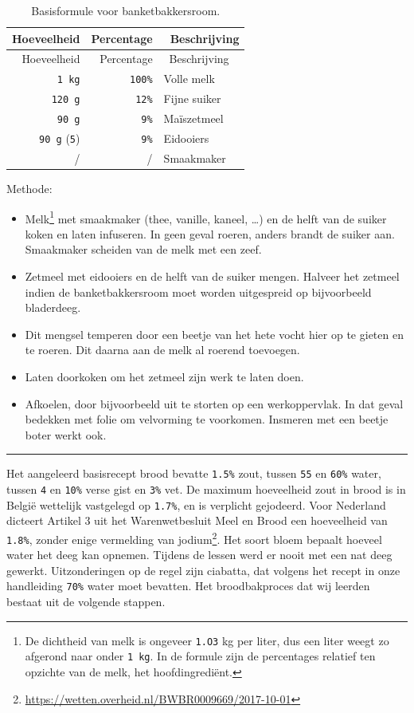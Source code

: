 \documentclass[
  11pt,
  dutch,
]{memoir}
\providecommand{\tightlist}{%
  \setlength{\itemsep}{0pt}\setlength{\parskip}{0pt}}
\begin{document}
\begin{longtable}[]{@{}rrl@{}}
\caption{Basisformule voor banketbakkersroom.}\tabularnewline
\toprule
Hoeveelheid & Percentage & ~Beschrijving\tabularnewline
\midrule
\endfirsthead
\toprule
Hoeveelheid & Percentage & ~Beschrijving\tabularnewline
\midrule
\endhead
\texttt{1\ kg} & \texttt{100\%} & Volle melk\tabularnewline
\texttt{120\ g} & \texttt{12\%} & Fijne suiker\tabularnewline
\texttt{90\ g} & \texttt{9\%} & Maïszetmeel\tabularnewline
\texttt{90\ g} (\texttt{5}) & \texttt{9\%} & Eidooiers\tabularnewline
/ & / & Smaakmaker\tabularnewline
\bottomrule
\end{longtable}

Methode:

\begin{itemize}
\tightlist
\item
  Melk\footnote{De dichtheid van melk is ongeveer \texttt{1.O3} kg per
    liter, dus een liter weegt zo afgerond naar onder \texttt{1\ kg}. In
    de formule zijn de percentages relatief ten opzichte van de melk,
    het hoofdingrediënt.} met smaakmaker (thee, vanille, kaneel, \ldots)
  en de helft van de suiker koken en laten infuseren. In geen geval
  roeren, anders brandt de suiker aan. Smaakmaker scheiden van de melk
  met een zeef.
\item
  Zetmeel met eidooiers en de helft van de suiker mengen. Halveer het
  zetmeel indien de banketbakkersroom moet worden uitgespreid op
  bijvoorbeeld bladerdeeg.
\item
  Dit mengsel temperen door een beetje van het hete vocht hier op te
  gieten en te roeren. Dit daarna aan de melk al roerend toevoegen.
\item
  Laten doorkoken om het zetmeel zijn werk te laten doen.
\item
  Afkoelen, door bijvoorbeeld uit te storten op een werkoppervlak. In
  dat geval bedekken met folie om velvorming te voorkomen. Insmeren met
  een beetje boter werkt ook.
\end{itemize}

\pfbreak

Het aangeleerd basisrecept brood bevatte \texttt{1.5\%} zout, tussen
\texttt{55} en \texttt{60\%} water, tussen \texttt{4} en \texttt{10\%}
verse gist en \texttt{3\%} vet. De maximum hoeveelheid zout in brood is
in België wettelijk vastgelegd op \texttt{1.7\%}, en is verplicht
gejodeerd. Voor Nederland dicteert Artikel 3 uit het Warenwetbesluit
Meel en Brood een hoeveelheid van \texttt{1.8\%}, zonder enige
vermelding van jodium\footnote{\url{https://wetten.overheid.nl/BWBR0009669/2017-10-01}}.
Het soort bloem bepaalt hoeveel water het deeg kan opnemen. Tijdens de
lessen werd er nooit met een nat deeg gewerkt. Uitzonderingen op de
regel zijn ciabatta, dat volgens het recept in onze handleiding
\texttt{70\%} water moet bevatten. Het broodbakproces dat wij leerden
bestaat uit de volgende stappen.
\end{document}
